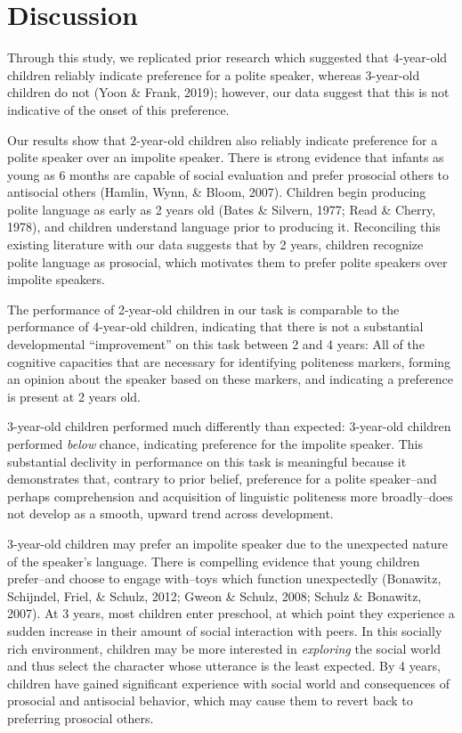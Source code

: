\documentclass[
  english,
  man,floatsintext]{apa6}
\begin{document}
\hypertarget{discussion}{%
\section{Discussion}\label{discussion}}

Through this study, we replicated prior research which suggested that 4-year-old children reliably indicate preference for a polite speaker, whereas 3-year-old children do not (Yoon \& Frank, 2019); however, our data suggest that this is not indicative of the onset of this preference.

Our results show that 2-year-old children also reliably indicate preference for a polite speaker over an impolite speaker. There is strong evidence that infants as young as 6 months are capable of social evaluation and prefer prosocial others to antisocial others (Hamlin, Wynn, \& Bloom, 2007). Children begin producing polite language as early as 2 years old (Bates \& Silvern, 1977; Read \& Cherry, 1978), and children understand language prior to producing it. Reconciling this existing literature with our data suggests that by 2 years, children recognize polite language as prosocial, which motivates them to prefer polite speakers over impolite speakers.

The performance of 2-year-old children in our task is comparable to the performance of 4-year-old children, indicating that there is not a substantial developmental ``improvement'' on this task between 2 and 4 years: All of the cognitive capacities that are necessary for identifying politeness markers, forming an opinion about the speaker based on these markers, and indicating a preference is present at 2 years old.

3-year-old children performed much differently than expected: 3-year-old children performed \emph{below} chance, indicating preference for the impolite speaker. This substantial declivity in performance on this task is meaningful because it demonstrates that, contrary to prior belief, preference for a polite speaker--and perhaps comprehension and acquisition of linguistic politeness more broadly--does not develop as a smooth, upward trend across development.

3-year-old children may prefer an impolite speaker due to the unexpected nature of the speaker's language. There is compelling evidence that young children prefer--and choose to engage with--toys which function unexpectedly (Bonawitz, Schijndel, Friel, \& Schulz, 2012; Gweon \& Schulz, 2008; Schulz \& Bonawitz, 2007). At 3 years, most children enter preschool, at which point they experience a sudden increase in their amount of social interaction with peers. In this socially rich environment, children may be more interested in \emph{exploring} the social world and thus select the character whose utterance is the least expected. By 4 years, children have gained significant experience with social world and consequences of prosocial and antisocial behavior, which may cause them to revert back to preferring prosocial others.
\end{document}
